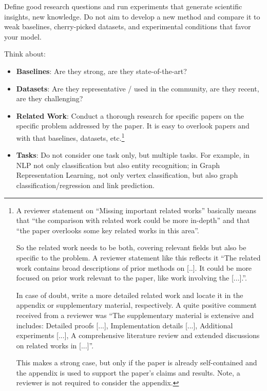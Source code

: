 \documentclass[sigconf, review, nonacm]{acmart}
\begin{document}
\begin{tcolorbox}[title=What is Strong and Ego-less Research?,colback=red!20]
Define good research questions and run experiments that generate scientific insights, \ie new knowledge.
Do not aim to develop a new method and compare it to weak baselines, cherry-picked datasets, and experimental conditions that favor your model.

Think about:

\begin{itemize}
\item \textbf{Baselines}: Are they strong, are they state-of-the-art?

\item \textbf{Datasets}: Are they representative / used in the community, are they recent, are they challenging?

\item \textbf{Related Work}:  Conduct a thorough research for specific papers on the specific problem addressed by the paper. It is easy to overlook papers and with that baselines, datasets, etc.\footnote{A reviewer statement on ``Missing important related works'' basically means that ``the comparison with related work could be more in-depth'' and that ``the paper overlooks some key related works in this area''. 

So the related work needs to be both, covering relevant fields but also be specific to the problem. A reviewer statement like this reflects it ``The related work contains broad descriptions of prior methods on [..]. It could be more focused on prior work relevant to the paper, like work involving the [...].''.

In case of doubt, write a more detailed related work and locate it in the appendix or supplementary material, respectively. A quite positive comment received from a reviewer was ``The supplementary material is extensive and includes: Detailed proofs [...], Implementation details [...], Additional experiments [...],  A comprehensive literature review and extended discussions on related works in [...]''. 

This makes a strong case, but only if the paper is already self-contained and the appendix is used to support the paper's claims and results. 
Note, a reviewer is not required to consider the appendix.}


\item \textbf{Tasks}: Do not consider one task only, but multiple tasks. 
For example, in NLP not only classification but also entity recognition; in Graph Representation Learning, not only vertex classification, but also graph classification/regression and link prediction.
\end{itemize}

\end{tcolorbox}
\end{document}
